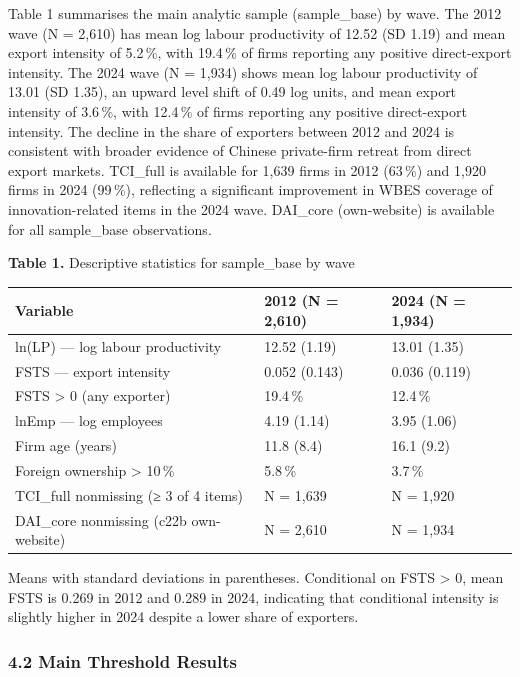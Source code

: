 \documentclass[12pt,a4paper]{article}
\begin{document}
Table 1 summarises the main analytic sample (sample\_base) by wave. The
2012 wave (N = 2,610) has mean log labour productivity of 12.52 (SD
1.19) and mean export intensity of 5.2\,\%, with 19.4\,\% of firms
reporting any positive direct-export intensity. The 2024 wave (N =
1,934) shows mean log labour productivity of 13.01 (SD 1.35), an upward
level shift of 0.49 log units, and mean export intensity of 3.6\,\%,
with 12.4\,\% of firms reporting any positive direct-export intensity.
The decline in the share of exporters between 2012 and 2024 is
consistent with broader evidence of Chinese private-firm retreat from
direct export markets. TCI\_full is available for 1,639 firms in 2012
(63\,\%) and 1,920 firms in 2024 (99\,\%), reflecting a significant
improvement in WBES coverage of innovation-related items in the 2024
wave. DAI\_core (own-website) is available for all sample\_base
observations.

\textbf{Table 1.} Descriptive statistics for sample\_base by wave

\begin{longtable}[]{@{}lll@{}}
\toprule\noalign{}
Variable & 2012 (N = 2,610) & 2024 (N = 1,934) \\
\midrule\noalign{}
\endhead
\bottomrule\noalign{}
\endlastfoot
ln(LP) --- log labour productivity & 12.52 (1.19) & 13.01 (1.35) \\
FSTS --- export intensity & 0.052 (0.143) & 0.036 (0.119) \\
FSTS \textgreater{} 0 (any exporter) & 19.4\,\% & 12.4\,\% \\
lnEmp --- log employees & 4.19 (1.14) & 3.95 (1.06) \\
Firm age (years) & 11.8 (8.4) & 16.1 (9.2) \\
Foreign ownership \textgreater{} 10\,\% & 5.8\,\% & 3.7\,\% \\
TCI\_full nonmissing (≥ 3 of 4 items) & N = 1,639 & N = 1,920 \\
DAI\_core nonmissing (c22b own-website) & N = 2,610 & N = 1,934 \\
\end{longtable}

Means with standard deviations in parentheses. Conditional on FSTS
\textgreater{} 0, mean FSTS is 0.269 in 2012 and 0.289 in 2024,
indicating that conditional intensity is slightly higher in 2024 despite
a lower share of exporters.

\hypertarget{42-main-threshold-results}{%
\subsubsection{4.2 Main Threshold
Results}\label{42-main-threshold-results}}
\end{document}
